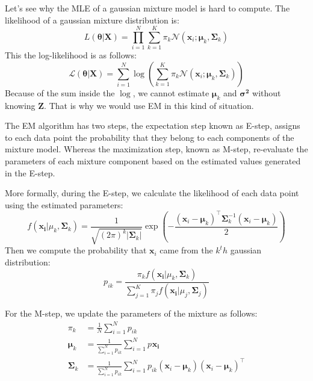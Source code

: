 \documentclass[12pt]{report}
\begin{document}
            Let's see why the MLE of a gaussian mixture model is hard to compute. The likelihood of a gaussian mixture distribution is:
            \begin{equation}
                L(\boldsymbol{\theta} | \boldsymbol{X}) = \prod_{i=1}^N\sum_{k=1}^{K} \pi_k \mathcal{N}(\boldsymbol{x}_i; \boldsymbol{\mu}_k, \boldsymbol{\Sigma}_k)
            \end{equation}
            This the log-likelihood is as follows:
            \begin{equation}
                \mathcal{L}(\boldsymbol{\theta} | \boldsymbol{X}) = \sum_{i=1}^N \log\left(\sum_{k=1}^{K} \pi_k \mathcal{N}(\boldsymbol{x}_i; \boldsymbol{\mu}_k, \boldsymbol{\Sigma}_k)\right)
            \end{equation}
            Because of the sum inside the $\log$, we cannot estimate $\boldsymbol{\mu}_k$ and $\boldsymbol{\sigma^2}$ without knowing $\boldsymbol{Z}$. That is why we would use EM in this kind of situation.
            
            The EM algorithm has two steps, the expectation step known as E-step, assigns to each data point the probability that they belong to each
            components of the mixture model. Whereas the maximization step, known as M-step, re-evaluate the parameters of each mixture component based on the estimated values generated in the E-step.
            
            More formally, during the E-step, we calculate the likelihood of each data point using the estimated parameters:
            \begin{equation}
                f(\boldsymbol{x_i}|\mu_k, \boldsymbol{\Sigma}_k) = \frac{1}{\sqrt{(2\pi)^k|\boldsymbol{\Sigma}_k|}} \exp\left(-\frac{(\boldsymbol{x}_i - \boldsymbol{\mu}_k)^\top \boldsymbol{\Sigma}_k^{-1}(\boldsymbol{x}_i - \boldsymbol{\mu}_k)}{2}\right)
            \end{equation}
            Then we compute the probability that $\boldsymbol{x}_i$ came from the $k^th$ gaussian distribution:
            \begin{equation}
                p_{ik} = \frac{\pi_k f(\boldsymbol{x_i}|\mu_k, \boldsymbol{\Sigma}_k)}{\sum_{j=1}^{K} \pi_j f(\boldsymbol{x_i}|\mu_j, \boldsymbol{\Sigma}_j)}
            \end{equation}
            
            For the M-step, we update the parameters of the mixture as follows:
            \begin{align}
                \pi_k &= \frac{1}{N}\sum_{i=1}^{N} p_{ik}\\
                \boldsymbol{\mu}_k &= \frac{1}{\sum_{i=1}^{N} p_{ik}} \sum_{i=1}^{N} p_{} \boldsymbol{x_i}\\
                \boldsymbol{\Sigma}_k &= \frac{1}{\sum_{i=1}^{N} p_{ik}} \sum_{i=1}^{N} p_{ik} (\boldsymbol{x}_i - \boldsymbol{\mu}_k) (\boldsymbol{x}_i - \boldsymbol{\mu}_k)^\top
            \end{align}
            
\end{document}
